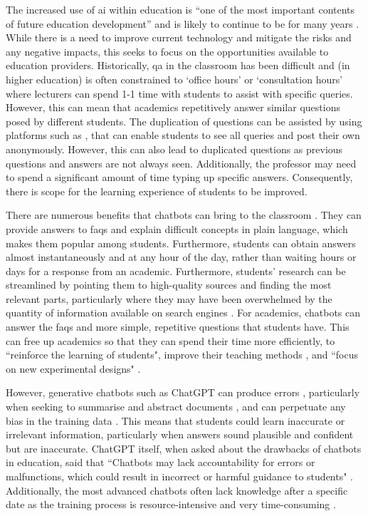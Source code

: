 The increased use of \acrshort{ai} within education is ``one of the most important contents of future education development” \citep{BrowMcCoReev2020eu} and is likely to continue to be for many years \citep{zawacki2019systematic}. While there is a need to improve current technology and mitigate the risks and any negative impacts, this \papertype seeks to focus on the opportunities available to education providers. Historically, \acrshort{qa} in the classroom has been difficult and (in higher education) is often constrained to `office hours' or `consultation hours' where lecturers can spend 1-1 time with students to assist with specific queries. However, this can mean that academics repetitively answer similar questions posed by different students. The duplication of questions can be assisted by using platforms such as \citet{Piazza}, that can enable students to see all queries and post their own anonymously. However, this can also lead to duplicated questions as previous questions and answers are not always seen. Additionally, the professor may need to spend a significant amount of time typing up specific answers. Consequently, there is scope for the learning experience of students to be improved.

There are numerous benefits that chatbots can bring to the classroom \citep{Stanislav}. They can provide answers to \acrshort{faq}s and explain difficult concepts in plain language, which makes them popular among students. Furthermore, students can obtain answers almost instantaneously and at any hour of the day, rather than waiting hours or days for a response from an academic. Furthermore, students' research can be streamlined by pointing them to high-quality sources and finding the most relevant parts, particularly where they may have been overwhelmed by the quantity of information available on search engines \citep{Chen22}. For academics, chatbots can answer the \acrshort{faq}s and more simple, repetitive questions that students have. This can free up academics so that they can spend their time more efficiently, to ``reinforce the learning of students", improve their teaching methods \citep{Prez2020}, and ``focus on new experimental designs" \citep{Eva}.

However, generative chatbots such as ChatGPT can produce errors \citep{marcus2018, Bender21, Eva}, particularly when seeking to summarise and abstract documents \citep{Durmus_2020}, and can perpetuate any bias in the training data \citep{geva2019, brown2020}. This means that students could learn inaccurate or irrelevant information, particularly when answers sound plausible and confident but are inaccurate. ChatGPT itself, when asked about the drawbacks of chatbots in education, said that ``Chatbots may lack accountability for errors or malfunctions, which could result in incorrect or harmful guidance to students" \citep{chatgpt23}. Additionally, the most advanced chatbots often lack knowledge after a specific date as the training process is resource-intensive and very time-consuming \citep{Jungherr}.

